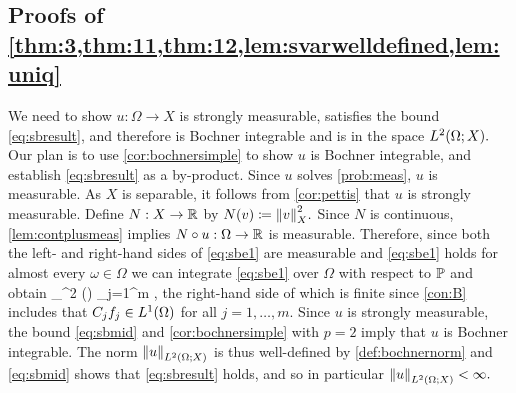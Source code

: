 \subsection{Proofs of \cref{thm:3,thm:11,thm:12,lem:svarwelldefined,lem:uniq}}
We need to show $u:\Omega \rightarrow X$ is strongly measurable, satisfies the bound \eqref{eq:sbresult}, and therefore is Bochner integrable and is in the space $\LtOX.$ Our plan is to use \cref{cor:bochnersimple} to show $u$ is Bochner integrable, and establish \eqref{eq:sbresult} as a by-product. Since $u$ solves \cref{prob:meas}, $u$ is measurable. As $X$ is separable, it follows from \cref{cor:pettis} that $u$ is strongly measurable.
Define $N:X \rightarrow \mathbb R$ by
$ N(v) \de \N{v}_X^2.$
Since $N$ is continuous, \cref{lem:contplusmeas} implies $N \circ u:\Omega \rightarrow \mathbb R$ is measurable. 
Therefore, since both the left- and right-hand sides of \eqref{eq:sbe1} are measurable and \eqref{eq:sbe1} holds for almost every $\omega \in \Omega$ we can integrate \eqref{eq:sbe1} over $\Omega$ with respect to $\mathbb P$ and obtain
\beq\label{eq:sbmid}
\int_\Omega {}^2 \dd\PP(\omega) \leq \sum_{j=1}^m \NLoO{\Cj\fj},
\eeq
the right-hand side of which is finite since \cref{con:B} includes that $\Cj\fj \in \LoO$ for all $j = 1,\ldots,m.$ Since $u$ is strongly measurable, the bound \eqref{eq:sbmid} and \cref{cor:bochnersimple} with $p=2$ imply that $u$ is Bochner integrable. The norm $\NLtOX{u}$ is thus well-defined by \cref{def:bochnernorm} and \eqref{eq:sbmid} shows that \eqref{eq:sbresult} holds, and so in particular $\NLtOX{u} < \infty.$
\epf

